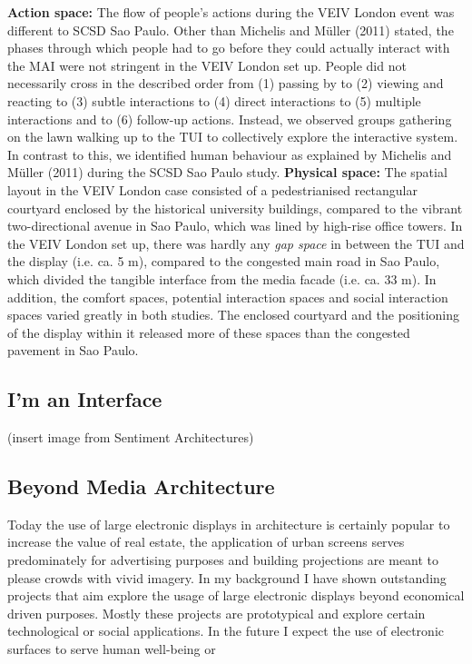 \textbf{Action space:} The flow of people’s actions during the VEIV London event was different to SCSD Sao Paulo. 
Other than Michelis and Müller (2011) stated, the phases through which people had to go before they could actually interact with the MAI were not stringent in the VEIV London set up. 
People did not necessarily cross in the described order from (1) passing by to (2) viewing and reacting to (3) subtle interactions to (4) direct interactions to (5) multiple interactions and to (6) follow-up actions.
Instead, we observed groups gathering on the lawn walking up to the TUI to collectively explore the interactive system. In contrast to this, we identified human behaviour as explained by Michelis and Müller (2011) during the SCSD Sao Paulo study.
\textbf{Physical space:} The spatial layout in the VEIV London case consisted of a pedestrianised rectangular courtyard enclosed by the historical university buildings, compared to the vibrant two-directional avenue in Sao Paulo, which was lined by high-rise office towers.
In the VEIV London set up, there was hardly any \textit{gap space} in between the TUI and the display (i.e. ca. 5 m), compared to the congested main road in Sao Paulo, which divided the tangible interface from the
media facade (i.e. ca. 33 m). 
In addition, the comfort spaces, potential interaction spaces and social interaction spaces varied greatly in both studies. 
The enclosed courtyard and the positioning of the display within it released more of these spaces than the congested pavement in Sao Paulo.



\subsection*{I'm an Interface}

(insert image from Sentiment Architectures)

\subsection{Beyond Media Architecture}

Today the use of large electronic displays in architecture is certainly popular to increase the value of real estate, the application of urban screens serves predominately for advertising purposes and building projections are meant to please crowds with vivid imagery. 
In my background I have shown outstanding projects that aim explore the usage of large electronic displays beyond economical driven purposes. Mostly these projects are prototypical and explore certain technological or social applications. In the future I expect the use of electronic surfaces to serve human well-being or    


